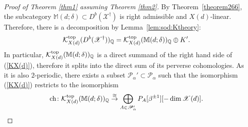 \documentclass [11pt,oneside,a4paper,mathscr]{amsart}
\theoremstyle{definition}
\newcommand{\X}{\mathscr{X}}
\newcommand{\ch}{\operatorname{ch}}
\begin{document}
\begin{proof}[Proof of Theorem \ref{thm1} assuming Theorem \ref{thm2}]
	By Theorem~\ref{theorem266}, 
	the  subcategory $\mathbb{M}(d; \delta) \subset D^b(\X^{\dag})$ 
	is right admissible and $X(d)$-linear. 
	Therefore, there is a decomposition by Lemma~\ref{lem:sod:Ktheory}:
	\begin{align}\label{decomp1}
		\mathcal{K}_{X(d)}^{\rm{top}}(D^b(\X^{\dag}))_{\mathbb{Q}}=
		\mathcal{K}_{X(d)}^{\rm{top}}(\mathbb{M}(d; \delta))_{\mathbb{Q}} \oplus K'. 		
		\end{align}
In particular, 
$\mathcal{K}_{X(d)}^{\rm{top}}(\mathbb{M}(d; \delta))_{\mathbb{Q}}$
is a direct summand of 
the right hand side of (\ref{KX(d)}), 
therefore it 
 splits into the direct sum of its perverse cohomologies. 
As it is also $2$-periodic, there exists a subset $\mathscr{P}_{\alpha}' \subset \mathscr{P}_{\alpha}$
such that the isomorphism (\ref{KX(d)}) restricts 
to the isomorphism
\begin{align}\label{Ktop:Mdelta}
	\ch \colon 
	\mathcal{K}_{X(d)}^{\rm{top}}(\mathbb{M}(d; \delta))_{\mathbb{Q}} \stackrel{\cong}{\to}
	 \bigoplus_{A \in \mathscr{P}_{\alpha}'}
	P_A[\beta^{\pm 1}][-\dim \X(d)]. 
	\end{align}


\end{proof}
\end{document}
